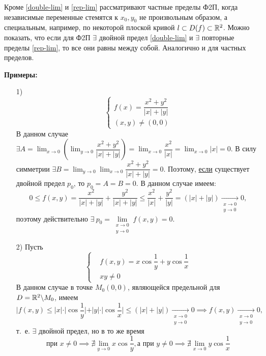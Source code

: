 \documentclass[../../main.tex]{subfiles}
\begin{document}
Кроме \eqref{double-lim} и \eqref{rep-lim} рассматривают частные
пределы Ф2П, когда независимые переменные стемятся к $x_0, y_0$
не произвольным образом, а специальным, например, по некоторой плоской
кривой $l \subset{D(f)} \subset \mathbb{R}^2$. Можно показать, что если для Ф2П
$\exists$ двойной предел \eqref{double-lim} и $\exists$ повторные
пределы \eqref{rep-lim}, то все они равны между собой. Аналогично и
для частных пределов.

\textbf{Примеры:}
\begin{itemize}
	\item[1)] 
	\[\left\{\begin{aligned}
		f(x) = \dfrac{x^2 + y^2}{|x| + |y|} \\
		(x, y) \ne (0, 0)
	\end{aligned}\right.\]
	В данном случае $\exists A = \displaystyle\lim_{x \to 0}
	{(\lim_{y \to 0}{ \dfrac{x^2 + y^2}{|x| + |y|} })} =
	\displaystyle \lim_{x \to 0}{\dfrac{x^2}{|x|}} =
	\displaystyle \lim_{x \to 0}{|x|} = 0$. В силу симметрии
	$\exists B = \displaystyle\lim_{y \to 0}
	{\lim_{x \to 0}{ \dfrac{x^2 + y^2}{|x| + |y|} }} = 0$.
	Поэтому, \underline{если} существует двойной предел $p_0$,
	то $p_0=A=B=0$. В данном случае имеем:
	\[
		0 \leq f(x, y) = 
		\dfrac{x^2}{|x| + |y|} + \dfrac{y^2}{|x| + |y|} \leq
		\dfrac{x^2}{|x|} + \dfrac{y^2}{|y|} = (|x| + |y|) 
		\underset{\substack{x \to 0 \\ y \to 0}}{\longrightarrow}0,
	\]
	поэтому действительно $\exists\ p_0 = \underset{\substack{x \to 0 \\ y \to 0}}
	{\lim}f(x, y) = 0$.
	
	\item[2)] Пусть \[\left\{\begin{aligned}
		&f(x, y) = x \cos{\dfrac{1}{y}} + y \cos{\dfrac{1}{x}} \\
		&xy \ne 0
	\end{aligned}\right.\]
	В данном случае в точке $M_0(0, 0)$, являющейся предельной для
	$D = \mathbb{R}^2 \backslash M_0$, имеем
	\[|f(x, y) \leq |x| \cdot |\cos{\dfrac{1}{y}}| + |y| \cdot 
	|\cos{\dfrac{1}{x}}| \leq (|x| + |y|) 
	\underset{\substack{x \to 0 \\ y \to 0}}{\longrightarrow}0 \implies
	f(x, y) \underset{\substack{x \to 0 \\ y \to 0}}{\longrightarrow}0,\] т.~е. 
	$\exists$ двойной предел, но в то же время 
	\[\text{при } x \ne 0 \implies \nexists \displaystyle \lim_{y \to 0}
	x \cos{\dfrac{1}{y}}, \text{а при } y \ne 0 \implies
	\nexists \displaystyle \lim_{x \to 0} y \cos{\dfrac{1}{x}}\] 
	

\end{itemize}
\end{document}
